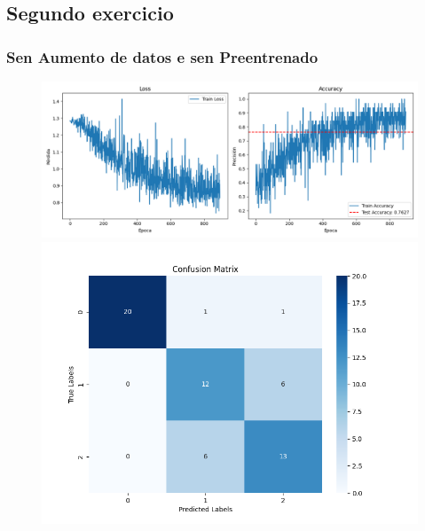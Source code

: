 \documentclass{article}
\begin{document}
\subsection{Segundo exercicio}
\subsubsection{Sen Aumento de datos e sen Preentrenado}
\begin{figure}[H]
    \centering
    \begin{minipage}{0.55\textwidth}
        \centering
        \includegraphics[width=\linewidth]{../ultimas_figuras/LOSS__A_False_P_False_D_True_MLP_True_efficientnet_b4.png}
    \end{minipage}
    \begin{minipage}{0.3\textwidth}
        \centering
        \includegraphics[width=\linewidth]{../ultimas_figuras/CM__A_False_P_False_D_True_MLP_True_efficientnet_b4.png}
    \end{minipage}
    \begin{minipage}{0.7\textwidth}
        \centering

\end{minipage}
\end{figure}
\end{document}
